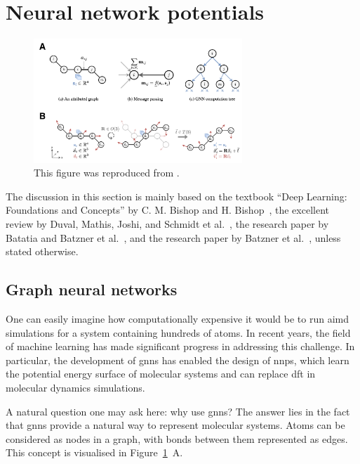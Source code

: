 \section{Neural network potentials}

\begin{figure}[t!]
    \centering
    \includegraphics[width=0.7\textwidth]{Figures/2_Theory/graph_and_geometric_nns.png}
    \caption{This figure was reproduced from \citep{duvalHitchhikersGuideGeometric2024}.}
    \label{fig:graph_and_geometric_nns}
\end{figure}

The discussion in this section is mainly based on the textbook ``Deep Learning: Foundations and Concepts'' by C. M. Bishop and H. Bishop~\citep{bishopDeepLearningFoundations2023}, the excellent review by Duval, Mathis, Joshi, and Schmidt et al.~\citep{duvalHitchhikersGuideGeometric2024}, the research paper by Batatia and Batzner et al.~\citep{batatiaDesignSpaceE3Equivariant2022}, and the research paper by Batzner et al.~\citep{batznerE3equivariantGraphNeural2022}, unless stated otherwise.

\subsection{Graph neural networks}
One can easily imagine how computationally expensive it would be to run \ac{aimd} simulations for a system containing hundreds of atoms. In recent years, the field of machine learning has made significant progress in addressing this challenge. In particular, the development of \acp{gnn} has enabled the design of \acp{nnp}, which learn the potential energy surface of molecular systems and can replace \ac{dft} in molecular dynamics simulations.

A natural question one may ask here: why use \acp{gnn}? The answer lies in the fact that \acp{gnn} provide a natural way to represent molecular systems. Atoms can be considered as nodes in a graph, with bonds between them represented as edges. This concept is visualised in Figure~\ref{fig:graph_and_geometric_nns}~A. 

